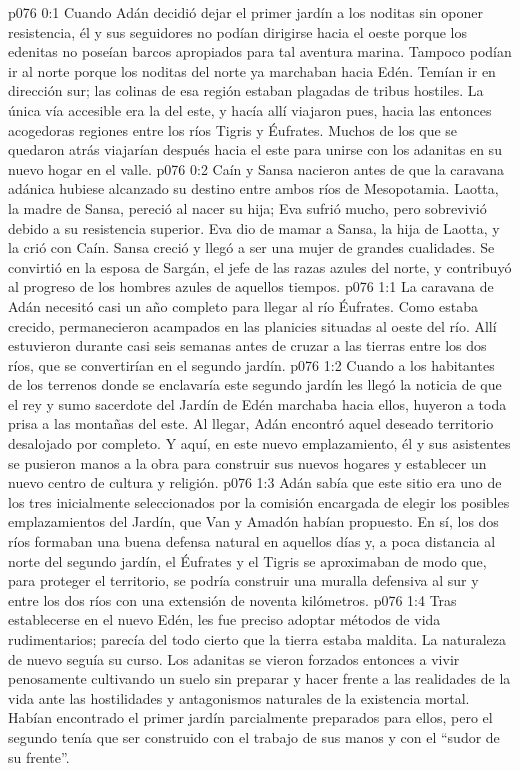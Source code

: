 \author{Solonia}
\vs p076 0:1 Cuando Adán decidió dejar el primer jardín a los noditas sin oponer resistencia, él y sus seguidores no podían dirigirse hacia el oeste porque los edenitas no poseían barcos apropiados para tal aventura marina. Tampoco podían ir al norte porque los noditas del norte ya marchaban hacia Edén. Temían ir en dirección sur; las colinas de esa región estaban plagadas de tribus hostiles. La única vía accesible era la del este, y hacía allí viajaron pues, hacia las entonces acogedoras regiones entre los ríos Tigris y Éufrates. Muchos de los que se quedaron atrás viajarían después hacia el este para unirse con los adanitas en su nuevo hogar en el valle.
\vs p076 0:2 \pc Caín y Sansa nacieron antes de que la caravana adánica hubiese alcanzado su destino entre ambos ríos de Mesopotamia. Laotta, la madre de Sansa, pereció al nacer su hija; Eva sufrió mucho, pero sobrevivió debido a su resistencia superior. Eva dio de mamar a Sansa, la hija de Laotta, y la crió con Caín. Sansa creció y llegó a ser una mujer de grandes cualidades. Se convirtió en la esposa de Sargán, el jefe de las razas azules del norte, y contribuyó al progreso de los hombres azules de aquellos tiempos.
\vs p076 1:1 La caravana de Adán necesitó casi un año completo para llegar al río Éufrates. Como estaba crecido, permanecieron acampados en las planicies situadas al oeste del río. Allí estuvieron durante casi seis semanas antes de cruzar a las tierras entre los dos ríos, que se convertirían en el segundo jardín.
\vs p076 1:2 Cuando a los habitantes de los terrenos donde se enclavaría este segundo jardín les llegó la noticia de que el rey y sumo sacerdote del Jardín de Edén marchaba hacia ellos, huyeron a toda prisa a las montañas del este. Al llegar, Adán encontró aquel deseado territorio desalojado por completo. Y aquí, en este nuevo emplazamiento, él y sus asistentes se pusieron manos a la obra para construir sus nuevos hogares y establecer un nuevo centro de cultura y religión.
\vs p076 1:3 Adán sabía que este sitio era uno de los tres inicialmente seleccionados por la comisión encargada de elegir los posibles emplazamientos del Jardín, que Van y Amadón habían propuesto. En sí, los dos ríos formaban una buena defensa natural en aquellos días y, a poca distancia al norte del segundo jardín, el Éufrates y el Tigris se aproximaban de modo que, para proteger el territorio, se podría construir una muralla defensiva al sur y entre los dos ríos con una extensión de noventa kilómetros.
\vs p076 1:4 \pc Tras establecerse en el nuevo Edén, les fue preciso adoptar métodos de vida rudimentarios; parecía del todo cierto que la tierra estaba maldita. La naturaleza de nuevo seguía su curso. Los adanitas se vieron forzados entonces a vivir penosamente cultivando un suelo sin preparar y hacer frente a las realidades de la vida ante las hostilidades y antagonismos naturales de la existencia mortal. Habían encontrado el primer jardín parcialmente preparados para ellos, pero el segundo tenía que ser construido con el trabajo de sus manos y con el “sudor de su frente”.
